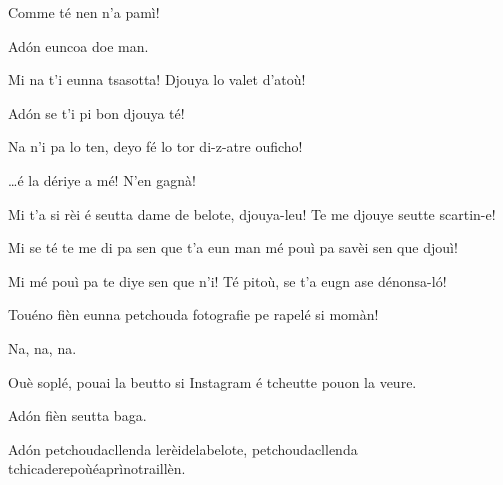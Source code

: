 \begin{drama}
\Tuenospeaks{} Comme té nen n'a pamì!


\Tuenospeaks Ad\'on euncoa doe man.


\Elettricistaspeaks {} Mi na t'i eunna tsasotta! Djouya lo valet d'atoù!

\Gerominespeaks Ad\'on se t'i pi bon djouya té!

\Elettricistaspeaks Na n'i pa lo ten, deyo fé lo tor di-z-atre ouficho!


\Saventaspeaks \ldots é la dériye a mé! N'en gagnà! 

\Richardspeaks{} Mi t'a si rèi é seutta dame de belote, djouya-leu! Te me djouye seutte scartin-e!

\Gerominespeaks Mi se té te me di pa sen que t'a eun man mé pouì pa savèi sen que djouì!

\Richardspeaks Mi mé pouì pa te diye sen que n'i! Té pitoù, se t'a eugn ase dénonsa-l\'o!


\Saventaspeaks Touéno fièn eunna petchouda fotografie pe rapelé si momàn!

\Tuenospeaks Na, na, na.

\Saventaspeaks  Ouè soplé, pouai la beutto si Instagram é tcheutte pouon la veure.

\Tuenospeaks Ad\'on fièn seutta baga.


\Saventaspeaks Ad\'on petchoudacllenda lerèidelabelote, petchoudacllenda tchicaderepoùéaprìnotraillèn.






\end{drama}
